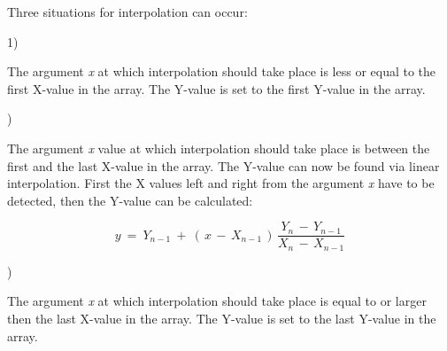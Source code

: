 \documentclass[11pt]{article}
\begin{document}
\bigskip
\bigskip
\bigskip
\bigskip
\bigskip
\bigskip
Three situations for interpolation can occur:

1)
\testlastline

\begin{indenting}{1.27cm}
The argument {\it x\/} at which interpolation should take place is less or equal to the first
X-value in the array. The Y-value is set to the first Y-value in the array.
\end{indenting}

 )
\testlastline

\begin{indenting}{1.27cm}
The argument {\it x\/} value at which interpolation should take place is between the first
and the last X-value in the array. The Y-value can now be found via linear
interpolation. First the X values left and right from the argument {\it x\/} have to be
detected, then the Y-value can be calculated:
\end{indenting}

\begin{displaymath}
y~=~ Y _{n-1} ~+~ (\, x\, -\, X _{n-1} \, )\,{\frac{ Y _{n} \, -\, Y _{n-1} }{X _{n} \, -\, X _{n-1} }}
\end{displaymath}

\bigskip
\bigskip
\bigskip
{})
\testlastline

\begin{indenting}{1.27cm}
The argument {\it x\/} at which interpolation should take place is equal to or larger then the
last X-value in the array. The Y-value is set to the last Y-value in the array.
\end{indenting}
\end{document}
